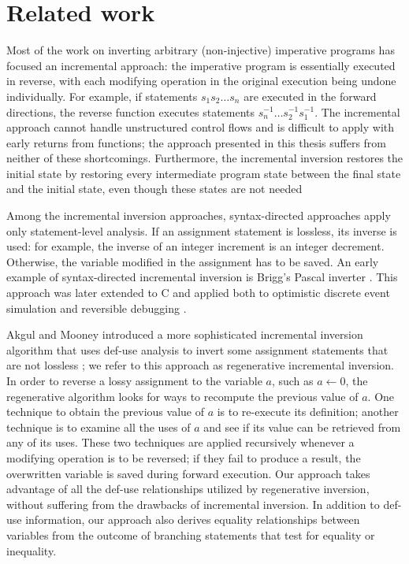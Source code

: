 \documentclass[12pt]{gatech-thesis}
\begin{document}
\section{Related work}
\label{sec:related-work}
Most of the work on inverting arbitrary (non-injective) imperative programs has focused an incremental approach: the imperative program is essentially executed in reverse, with each modifying operation in the original execution being undone individually.
For example, if statements $s_{1} s_{2} \dots s_{n}$ are executed in the forward directions, the reverse function executes statements $s_{n}^{-1} \dots s_{2}^{-1} s_{1}^{-1}$.
The incremental approach cannot handle unstructured control flows and is difficult to apply with early returns from functions; the approach presented in this thesis suffers from neither of these shortcomings.  
Furthermore, the incremental inversion restores the initial state by restoring every intermediate program state between the final state and the initial state, even though these states are not needed

Among the incremental inversion approaches, syntax-directed approaches apply only statement-level analysis. 
If an assignment statement is lossless, its inverse is used: for example, the inverse of an integer increment is an integer decrement.
Otherwise, the variable modified in the assignment has to be saved.
An early example of syntax-directed incremental inversion is Brigg's Pascal inverter \cite{Briggs1987}. 
This approach was later extended to C and applied both to optimistic discrete event simulation \cite{Carothers1999} and reversible debugging \cite{Biswas1999}.

Akgul and Mooney introduced a more sophisticated incremental inversion algorithm that uses def-use analysis to invert some assignment statements that are not lossless \cite{Akgul2004a}; we refer to this approach as regenerative incremental inversion.
In order to reverse a lossy assignment to the variable $a$, such as $a \leftarrow 0$, the regenerative algorithm looks for ways to recompute the previous value of $a$. 
One technique to obtain the previous value of $a$ is to re-execute its definition; another technique is to examine all the uses of $a$ and see if its value can be retrieved from any of its uses. 
These two techniques are applied recursively whenever a modifying operation is to be reversed; if they fail to produce a result, the overwritten variable is saved during forward execution.
Our approach takes advantage of all the def-use relationships utilized by regenerative inversion, without suffering from the drawbacks of incremental inversion. 
In addition to def-use information, our approach  also derives equality relationships between variables from the outcome of branching statements that test for equality or inequality.
\end{document}
